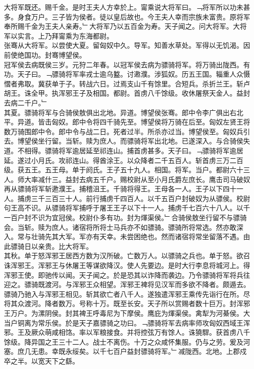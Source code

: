 \documentclass{zhvt-classic}
\begin{document}
\hspace*{2em}大将军既还。赐千金。是时王夫人方幸於上。甯乘说大将军曰。﹁将军所以功未甚多。身食万户。三子皆为侯者。徒以皇后故也。今王夫人幸而宗族未富贵。原将军奉所赐千金为王夫人亲寿。﹂大将军乃以五百金为寿。天子闻之。问大将军。大将军以实言。上乃拜甯乘为东海都尉。\\
\hspace*{2em}张骞从大将军。以尝使大夏。留匈奴中久。导军。知善水草处。军得以无饥渴。因前使绝国功。封骞博望侯。\\
\hspace*{2em}冠军侯去病既侯三岁。元狩二年春。以冠军侯去病为骠骑将军。将万骑出陇西。有功。天子曰。﹁骠骑将军率戎士逾乌盭。讨遫濮。涉狐奴。历五王国。辎重人众慑慴者弗取。冀获单于子。转战六日。过焉支山千有馀里。合短兵。杀折兰王。斩卢胡王。诛全甲。执浑邪王子及相国。都尉。首虏八千馀级。收休屠祭天金人。益封去病二千户。﹂\\
\hspace*{2em}其夏。骠骑将军与合骑侯敖俱出北地。异道。博望侯张骞。郎中令李广俱出右北平。异道。皆击匈奴。郎中令将四千骑先至。博望侯将万骑在后至。匈奴左贤王将数万骑围郎中令。郎中令与战二日。死者过半。所杀亦过当。博望侯至。匈奴兵引去。博望侯坐行留。当斩。赎为庶人。而骠骑将军出北地。已遂深入。与合骑侯失道。不相得。骠骑将军逾居延至祁连山。捕首虏甚多。天子曰。﹁骠骑将军逾居延。遂过小月氏。攻祁连山。得酋涂王。以众降者二千五百人。斩首虏三万二百级。获五王。五王母。单于阏氏。王子五十九人。相国。将军。当户。都尉六十三人。师大率减什三。益封去病五千户。赐校尉从至小月氏爵左庶长。鹰击司马破奴再从骠骑将军斩遬濮王。捕稽沮王。千骑将得王。王母各一人。王子以下四十一人。捕虏三千三百三十人。前行捕虏千四百人。以千五百户封破奴为从骠侯。校尉句王高不识。从骠骑将军捕呼于屠王王子以下十一人。捕虏千七百六十八人。以千一百户封不识为宜冠侯。校尉仆多有功。封为煇渠侯。﹂合骑侯敖坐行留不与骠骑会。当斩。赎为庶人。诸宿将所将士马兵亦不如骠骑。骠骑所将常选。然亦敢深入。常与壮骑先其大军。军亦有天幸。未尝困绝也。然而诸宿将常坐留落不遇。由此骠骑日以亲贵。比大将军。\\
\hspace*{2em}其秋。单于怒浑邪王居西方数为汉所破。亡数万人。以骠骑之兵也。单于怒。欲召诛浑邪王。浑邪王与休屠王等谋欲降汉。使人先要边。是时大行李息将城河上。得浑邪王使。即驰传以闻。天子闻之。於是恐其以诈降而袭边。乃令骠骑将军将兵往迎之。骠骑既渡河。与浑邪王众相望。浑邪王裨将见汉军而多欲不降者。颇遁去。骠骑乃驰入与浑邪王相见。斩其欲亡者八千人。遂独遣浑邪王乘传先诣行在所。尽将其众渡河。降者数万。号称十万。既至长安。天子所以赏赐者数十巨万。封浑邪王万户。为漯阴侯。封其裨王呼毒尼为下摩侯。鹰庇为煇渠侯。禽犁为河綦侯。大当户铜离为常乐侯。於是天子嘉骠骑之功曰。﹁骠骑将军去病率师攻匈奴西域王浑邪。王及厥众萌咸相饹。率以军粮接食。并将控弦万有馀人。诛獟駻。获首虏八千馀级。降异国之王三十二人。战士不离伤。十万之众咸怀集服。仍与之劳。爰及河塞。庶几无患。幸既永绥矣。以千七百户益封骠骑将军。﹂减陇西。北地。上郡戍卒之半。以宽天下之繇。\\
\end{document}

